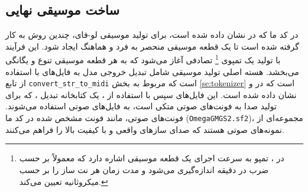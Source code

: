\subsection{ساخت موسیقی نهایی}\label{finalMusic}
در کد ما که در  نشان داده شده است، برای تولید موسیقی لو-فای، چندین روش به کار گرفته شده است
تا یک قطعه موسیقی منحصر به فرد و هماهنگ ایجاد شود. این فرآیند با تولید
یک تمپوی \footnote{در ، تمپو به سرعت اجرای یک قطعه موسیقی اشاره دارد که معمولاً بر حسب ضرب در دقیقه  اندازه‌گیری می‌شود و مدت زمان هر نت ساز را بر حسب میکروثانیه تعیین می‌کند.} تصادفی آغاز می‌شود که به هر قطعه موسیقی تنوع و یگانگی می‌بخشد.
هسته اصلی تولید موسیقی شامل تبدیل خروجی مدل به فایل‌های  با استفاده
از تابع \texttt{convert\_str\_to\_midi} است که مربوط به بخش \ref{se:tokenizer} است که در  و  نشان داده شده است. این فایل‌های  سپس با
استفاده از ، یک کتابخانه تبدیل ، که برای تولید صدا به
فونت‌های صوتی متکی است، به فایل‌های صوتی استفاده می‌شوند. فونت‌های صوتی، مانند
فونت مشخص شده در کد ما
(\texttt{OmegaGMGS2.sf2})، مجموعه‌ای از
نمونه‌های صوتی هستند که صدای سازهای واقعی و با کیفیت بالا را فراهم
می‌کنند.


